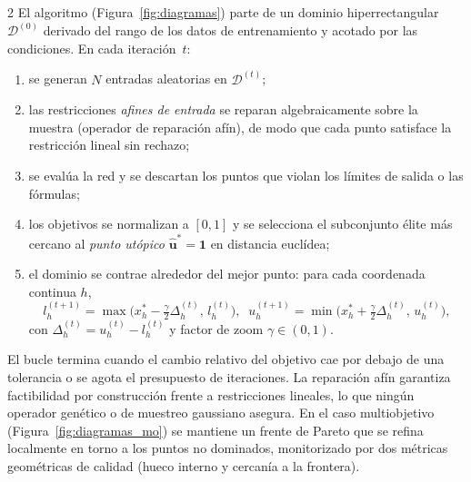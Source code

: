 \documentclass[5p,times,authoryear]{sciarticle}
\begin{document}
\begin{multicols}{2}
El algoritmo (Figura~\ref{fig:diagramas}) parte de un dominio
hiperrectangular $\mathcal{D}^{(0)}$ derivado del rango de los datos de
entrenamiento y acotado por las condiciones. En cada iteración~$t$:
\begin{enumerate}\itemsep2pt
\item se generan $N$ entradas aleatorias en $\mathcal{D}^{(t)}$;
\item las restricciones \emph{afines de entrada} se reparan
  algebraicamente sobre la muestra (operador de reparación afín), de modo
  que cada punto satisface la restricción lineal sin rechazo;
\item se evalúa la red y se descartan los puntos que violan los límites
  de salida o las fórmulas;
\item los objetivos se normalizan a $[0,1]$ y se selecciona el
  subconjunto élite más cercano al \emph{punto utópico}
  $\hat{\bm{u}}^\ast=\bm{1}$ en distancia euclídea;
\item el dominio se contrae alrededor del mejor punto: para cada
  coordenada continua $h$,
  \begin{equation}
    l_h^{(t+1)}=\max\!\bigl(x_h^\ast-\tfrac{\gamma}{2}\Delta_h^{(t)},\,l_h^{(t)}\bigr),\;\;
    u_h^{(t+1)}=\min\!\bigl(x_h^\ast+\tfrac{\gamma}{2}\Delta_h^{(t)},\,u_h^{(t)}\bigr),
    \label{eq:reshape}
  \end{equation}
  con $\Delta_h^{(t)}=u_h^{(t)}-l_h^{(t)}$ y factor de zoom
  $\gamma\in(0,1)$.
\end{enumerate}
El bucle termina cuando el cambio relativo del objetivo cae por debajo de
una tolerancia o se agota el presupuesto de iteraciones. La reparación
afín garantiza factibilidad por construcción frente a restricciones
lineales, lo que ningún operador genético o de muestreo gaussiano asegura.
En el caso multiobjetivo (Figura~\ref{fig:diagramas_mo}) se mantiene un
frente de Pareto que se refina localmente en torno a los puntos no
dominados, monitorizado por dos métricas geométricas de calidad (hueco
interno y cercanía a la frontera).


\end{multicols}
\end{document}

